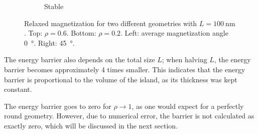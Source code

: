 \documentclass[11pt,a4paper,english]{article}
\begin{document}
\begin{figure}
\begin{subfigure}[b]{0.2\textwidth}
         \caption*{Stable}
         \label{fig:barrier-magnetization-20x100_diag}
     \end{subfigure}
        \caption{Relaxed magnetization for two different geometries with $L=\SI{100}{\nano\metre}$. Top: $\rho=0.6$. Bottom: $\rho=0.2$. Left: average magnetization angle \SI{0}{\degree}. Right: \SI{45}{\degree}.}
        \label{fig:barrier-magnetization}
\end{figure}
The energy barrier also depends on the total size $L$; when halving $L$, the energy barrier becomes approximately 4 times smaller. This indicates that the energy barrier is proportional to the volume of the island, as its thickness was kept constant.

The energy barrier goes to zero for $\rho \rightarrow 1$, as one would expect for a perfectly round geometry. However, due to numerical error, the barrier is not calculated as exactly zero, which will be discussed in the next section.
\end{document}
